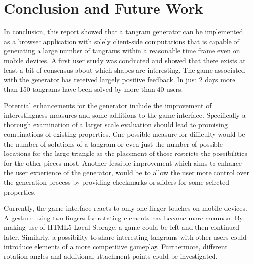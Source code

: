 \chapter{Conclusion and Future Work}\label{chapter:conclusion}

In conclusion, this report showed that a tangram generator can be implemented as a browser application with solely client-side computations that is capable of generating a large number of tangrams within a reasonable time frame even on mobile devices. A first user study was conducted and showed that there exists at least a bit of consensus about which shapes are interesting. The game associated with the generator has received largely positive feedback. In just 2 days more than 150 tangrams have been solved by more than 40 users. 

Potential enhancements for the generator include the improvement of interestingness measures and some additions to the game interface. Specifically a thorough examination of a larger scale evaluation should lead to promising combinations of existing properties. One possible measure for difficulty would be the number of solutions of a tangram or even just the number of possible locations for the large triangle as the placement of those restricts the possibilities for the other pieces most. Another feasible improvement which aims to enhance the user experience of the generator, would be to allow the user more control over the generation process by providing checkmarks or sliders for some selected properties. 

Currently, the game interface reacts to only one finger touches on mobile devices. A gesture using two fingers for rotating elements has become more common. By making use of HTML5 Local Storage, a game could be left and then continued later. Similarly, a possibility to share interesting tangrams with other users could introduce elements of a more competitive gameplay. Furthermore, different rotation angles and additional attachment points could be investigated. 